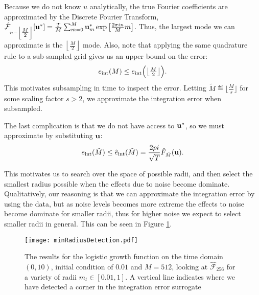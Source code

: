 Because we do not know $u$ analytically, the true Fourier coefficients are approximated by the Discrete Fourier Transform, $\hat{\mathcal{F}}_{n - \left\lfloor \tfrac{M}{2} \right\rfloor}[\mathbf{u}^*] = \frac{T}{M} \sum_{m=0}^{M} \mathbf{u}^*_m \exp \left[\frac{ 2\pi i n}{M} m\right]$. Thus, the largest mode we can approximate is the $\left\lfloor\frac{M}{2}\right\rfloor$ mode. Also, note that applying the same quadrature rule to a sub-sampled grid gives us an upper bound on the error: 
\[e_\text{int}(M) \leq e_\text{int}\Bigl(\bigl\lfloor\tfrac{M}{2}\bigr\rfloor\Bigr).\]
This motivates subsampling in time to inspect the error. Letting $\tilde{M} \eqdef \bigl\lfloor \frac{M}{s} \bigr\rfloor$ for some scaling factor $s>2$, we approximate the integration error when subsampled.

The last complication is that we do not have access to $\mathbf{u}^*$, so we must approximate by substituting $\mathbf{u}$: 
\[e_\text{int}(\tilde{M}) \leq \hat{e}_\text{int}(\tilde{M}) = \frac{2 pi}{\sqrt{T}} \hat{F}_{\tilde{M}}(\mathbf{u}).\]

This motivates us to search over the space of possible radii, and then select the smallest radius possible when the effects due to noise become dominate.
Qualitatively, our reasoning is that we can approximate the integration error by using the data, but as noise levels becomes more extreme the effects to noise become dominate for smaller radii, thus for higher noise we expect to select smaller radii in general. This can be seen in Figure \ref{fig:minRad}.
\begin{figure}[H] 
	\centering
	\texttt{[image: minRadiusDetection.pdf]}
	\caption{The results for the logistic growth function on the time domain $(0,10)$, initial condition of $0.01$ and $M=512$, looking at $\hat{\mathcal{F}}_{256}$ for a variety of radii  $m_t \in [0.01, 1]$. A vertical line indicates where we have detected a corner in the integration error surrogate}
	\label{fig:minRad}
\end{figure}

